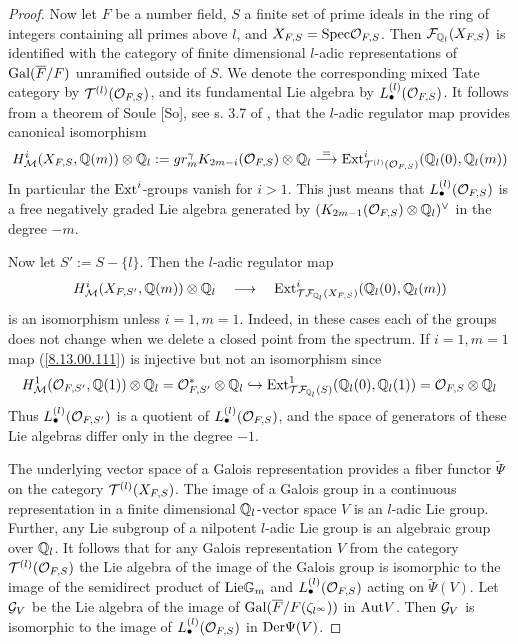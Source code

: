 \documentclass[10pt]{article}
\begin{document}
\begin{proof}
Now let $F$ be a number field, $S$ a finite set of prime ideals in the ring of integers 
containing 
all primes above $l$, and $X_{F,S} = {\rm Spec} {\cal O}_{F,S}$. 
 Then  
${\cal F}_{{\mathbb Q}_l}(X_{F,S})$ is identified with the category 
of finite dimensional $l$-adic representations of ${\rm Gal}(\overline F/F)$ 
unramified outside of ${S}$. 
We denote the corresponding mixed Tate category by 
${\cal T}^{(l)}({\cal O}_{F,S})$, 
and its fundamental Lie algebra by $L_{\bullet}^{(l)}({\cal O}_{F,S})$.  
It follows from a 
theorem of Soule [So], see s. 3.7 of \cite{G4},  that 
the $l$-adic regulator map provides canonical isomorphism 
\begin{equation} \label{8.13.00.1}
H^i_{\cal M}(X_{F,S}, {\mathbb Q}(m))\otimes {\mathbb Q}_l := 
gr^{\gamma}_mK_{2m-i}({\cal O}_{F,S}) \otimes {\mathbb Q}_l 
\stackrel{=}{\longrightarrow} 
{\rm Ext}_{{\cal T}^{(l)}({\cal O}_{F,S})}^i({\mathbb Q}_l(0), {\mathbb Q}_l(m)) 
\end{equation}
 In particular the ${\rm Ext}^i$-groups vanish for $i>1$. 
   This just means that  $L^{(l)}_{\bullet}({\cal O}_{F,S})$ is a free negatively 
graded 
Lie algebra generated by $(K_{2m-1}({\cal O}_{F,S}) \otimes {\mathbb Q}_l)^{\vee}$ in the degree $-m$. 

Now let ${S}':= {S} - \{l\}$. Then the $l$-adic regulator map 
\begin{equation} \label{8.13.00.111}
H^i_{\cal M}(X_{F,S'}, {\mathbb Q}(m))\otimes {\mathbb Q}_l \quad  
\stackrel{}{\longrightarrow} \quad
{\rm Ext}_{{\cal T}{\cal F}_{{\mathbb Q}_l}(X_{F,S})}^i({\mathbb Q}_l(0), {\mathbb Q}_l(m)) 
\end{equation}
is an isomorphism unless $i=1, m=1$. Indeed, in these cases each of the 
groups does not change when we delete 
a closed point from the spectrum. 
If $i=1, m=1$ map (\ref{8.13.00.111}) is injective but not an isomorphism since 
 $$
H^1_{\cal M}({\cal O}_{F,S'}, {\mathbb Q}(1))\otimes {\mathbb Q}_l = {\cal O}_{F,S'}^* \otimes {\mathbb Q}_l 
\hookrightarrow {\rm Ext}_{{\cal T}{\cal F}_{{\mathbb Q}_l}(S)}^1({\mathbb Q}_l(0), {\mathbb Q}_l(1)) = 
{\cal O}_{F,S} \otimes {\mathbb Q}_l
$$  Thus 
$L^{(l)}_{\bullet}({\cal O}_{F,S'})$ is a quotient of 
$L^{(l)}_{\bullet}({\cal O}_{F,S})$, and the space of 
generators of
 these
 Lie algebras differ only in the degree $-1$. 


 The underlying vector space of a Galois 
representation provides a fiber functor $\widetilde \Psi$
  on the category ${\cal T}^{(l)}(X_{F,S})$. 
The image of a Galois group in a continuous  
representation  in a finite dimensional ${\mathbb Q}_l$-vector space  $V$
is an $l$-adic Lie group. Further, any Lie subgroup of a nilpotent $l$-adic Lie 
group is an algebraic group over ${\mathbb Q}_l$. It follows that  for any Galois representation 
$V$ from the category ${\cal T}^{(l)}({\cal O}_{F,S})$ 
the Lie algebra of the image of the Galois group is isomorphic to 
the image of the semidirect product of ${\rm Lie}{\mathbb G}_m$ and 
$L^{(l)}_{\bullet}({\cal O}_{F,S})$ acting 
on $\widetilde \Psi(V)$. 
Let ${\cal G}_V$  be the Lie algebra of the image of 
${\rm Gal}(\overline F/ F(\zeta_{l^{\infty}}))$ in ${\rm Aut}V$.  
Then ${\cal G}_V$ 
is isomorphic to the image of $L^{(l)}_{\bullet}({\cal O}_{F,S})$ 
 in ${\rm Der}\Psi(V)$. 


\end{proof}
\end{document}
